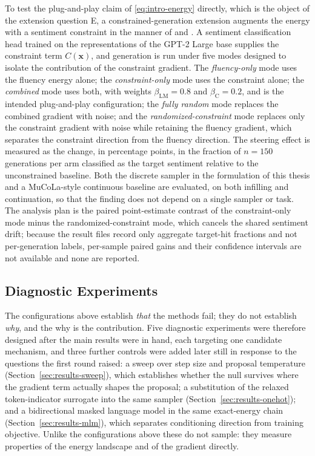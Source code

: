 To test the plug-and-play claim of \eqref{eq:intro-energy} directly, which is the object of the extension question E, a constrained-generation extension augments the energy with a sentiment constraint in the manner of \citet{kumar2022gradient} and \citet{qin2022cold}. A sentiment classification head trained on the representations of the GPT-2 Large base supplies the constraint term $C(\bm{x})$, and generation is run under five modes designed to isolate the contribution of the constraint gradient. The \emph{fluency-only} mode uses the fluency energy alone; the \emph{constraint-only} mode uses the constraint alone; the \emph{combined} mode uses both, with weights $\beta_{\text{LM}} = 0.8$ and $\beta_{\text{C}} = 0.2$, and is the intended plug-and-play configuration; the \emph{fully random} mode replaces the combined gradient with noise; and the \emph{randomized-constraint} mode replaces only the constraint gradient with noise while retaining the fluency gradient, which separates the constraint direction from the fluency direction. The steering effect is measured as the change, in percentage points, in the fraction of $n = 150$ generations per arm classified as the target sentiment relative to the unconstrained baseline. Both the discrete sampler in the formulation of this thesis and a MuCoLa-style continuous baseline are evaluated, on both infilling and continuation, so that the finding does not depend on a single sampler or task. The analysis plan is the paired point-estimate contrast of the constraint-only mode minus the randomized-constraint mode, which cancels the shared sentiment drift; because the result files record only aggregate target-hit fractions and not per-generation labels, per-sample paired gains and their confidence intervals are not available and none are reported.

\subsection{Diagnostic Experiments}
\label{sec:meth-diagnostics}

The configurations above establish \emph{that} the methods fail; they do not establish \emph{why}, and the why is the contribution. Five diagnostic experiments were therefore designed after the main results were in hand, each targeting one candidate mechanism, and three further controls were added later still in response to the questions the first round raised: a sweep over step size and proposal temperature (Section~\ref{sec:results-sweep}), which establishes whether the null survives where the gradient term actually shapes the proposal; a substitution of the relaxed token-indicator surrogate into the same sampler (Section~\ref{sec:results-onehot}); and a bidirectional masked language model in the same exact-energy chain (Section~\ref{sec:results-mlm}), which separates conditioning direction from training objective. Unlike the configurations above these do not sample: they measure properties of the energy landscape and of the gradient directly.

